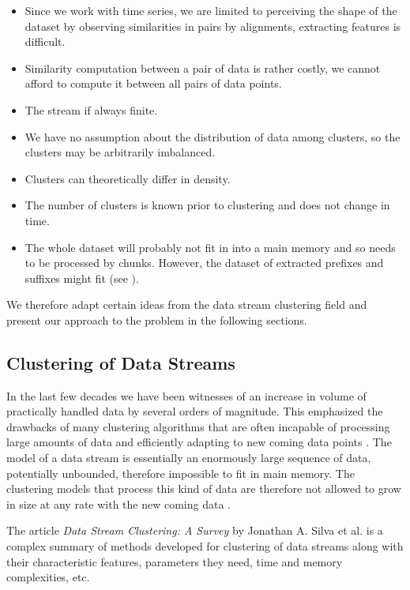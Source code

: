 \begin{itemize}
    \item Since we work with time series, we are limited to perceiving the shape of the dataset by observing similarities in pairs by alignments, extracting features is difficult.
    \item Similarity computation between a pair of data is rather costly, we cannot afford to compute it between all pairs of data points.
    \item The stream if always finite.
    \item We have no assumption about the distribution of data among clusters, so the clusters may be arbitrarily imbalanced.
    \item Clusters can theoretically differ in density.
    \item The number of clusters is known prior to clustering and does not change in time.
    \item The whole dataset will probably not fit in into a main memory and so needs to be processed by chunks. However, the dataset of extracted prefixes and suffixes might fit (see \cite{Deepbinner}).
\end{itemize}

We therefore adapt certain ideas from the data stream clustering field and present our approach to the problem in the following sections.

\subsection{Clustering of Data Streams}
In the last few decades we have been witnesses of an increase in volume of practically handled data by several orders of magnitude. This emphasized the drawbacks of many clustering algorithms that are often incapable of processing large amounts of data and efficiently adapting to new coming data points \cite{silva2013data}. The model of a data stream is essentially an enormously large sequence of data, potentially unbounded, therefore impossible to fit in main memory. The clustering models that process this kind of data are therefore not allowed to grow in size at any rate with the new coming data \cite{silva2013data}. 

The article \textit{Data Stream Clustering: A Survey}  by Jonathan A. Silva et al. \cite{silva2013data} is a complex summary of methods developed for clustering of data streams along with their characteristic features, parameters they need, time and memory complexities, etc.

